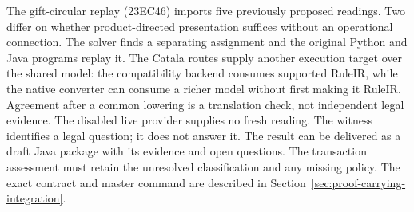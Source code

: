 \documentclass[12pt,a4paper,oneside,openany]{book}
\begin{document}
\begin{MapDiagram}
\end{MapDiagram}

The gift-circular replay (23EC46) imports five previously proposed readings. Two differ
on whether product-directed presentation suffices without an operational
connection. The solver finds a separating assignment and the original Python
and Java programs replay it. The Catala routes supply another execution target
over the shared model: the compatibility backend consumes supported RuleIR,
while the native converter can consume a richer model without first making it
RuleIR. Agreement after a common lowering is a translation check, not
independent legal evidence. The disabled live provider supplies no fresh
reading. The witness identifies a legal question; it does not answer it.
The result can be delivered
as a draft Java package with its evidence and open questions. The transaction
assessment must retain the unresolved classification and any missing policy.
The exact contract and master command are described in
Section~\ref{sec:proof-carrying-integration}.
\end{document}
